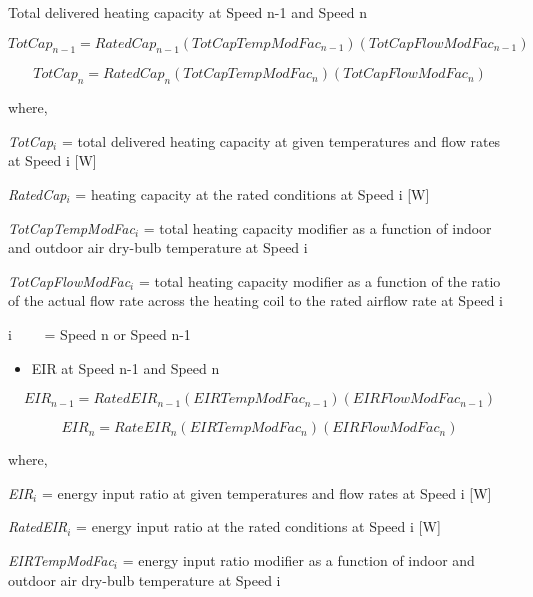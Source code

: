 Total delivered heating capacity at Speed n-1 and Speed n

\begin{equation}
  TotCa{p_{n - 1}} = RatedCa{p_{n - 1}}\left( {TotCapTempModFa{c_{n - 1}}} \right)\left( {TotCapFlowModFa{c_{n - 1}}} \right)
\end{equation}

\begin{equation}
  TotCa{p_n} = RatedCa{p_n}\left( {TotCapTempModFa{c_n}} \right)\left( {TotCapFlowModFa{c_n}} \right)
\end{equation}

where,

\emph{TotCap\(_{i}\)} = total delivered heating capacity at given temperatures and flow rates at Speed i {[}W{]}

\emph{RatedCap\(_{i}\)} = heating capacity at the rated conditions at Speed i {[}W{]}

\emph{TotCapTempModFac\(_{i}\)} = total heating capacity modifier as a function of indoor and outdoor air dry-bulb temperature at Speed i

\emph{TotCapFlowModFac\(_{i}\)} = total heating capacity modifier as a function of the ratio of the actual flow rate across the heating coil to the rated airflow rate at Speed i

i~~~~ = Speed n or Speed n-1

\begin{itemize}
  \item EIR at Speed n-1 and Speed n
\end{itemize}

\begin{equation}
EI{R_{n - 1}} = RatedEI{R_{n - 1}}\left( {EIRTempModFa{c_{n - 1}}} \right)\left( {EIRFlowModFa{c_{n - 1}}} \right)
\end{equation}

\begin{equation}
EI{R_n} = RateEI{R_n}\left( {EIRTempModFa{c_n}} \right)\left( {EIRFlowModFa{c_n}} \right)
\end{equation}

where,

\emph{EIR\(_{i}\)} = energy input ratio at given temperatures and flow rates at Speed i {[}W{]}

\emph{RatedEIR\(_{i}\)} = energy input ratio at the rated conditions at Speed i {[}W{]}

\emph{EIRTempModFac\(_{i}\)} = energy input ratio modifier as a function of indoor and outdoor air dry-bulb temperature at Speed i

